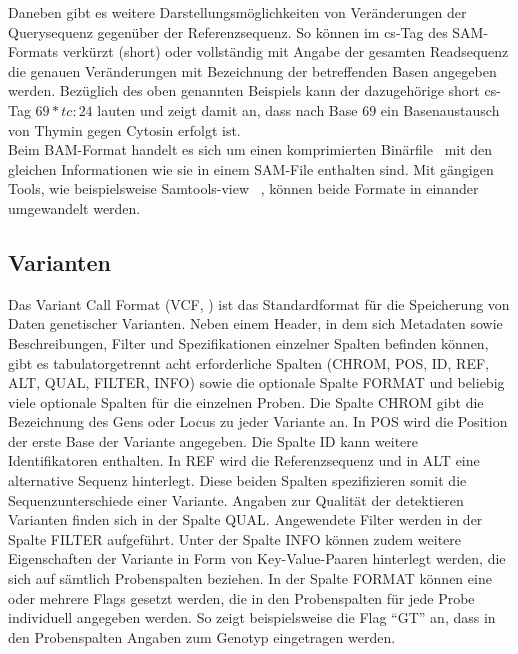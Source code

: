 Daneben gibt es weitere Darstellungsmöglichkeiten von Veränderungen der Querysequenz gegenüber der Referenzsequenz. So können im cs-Tag des SAM-Formats verkürzt (short) oder vollständig mit Angabe der gesamten Readsequenz die genauen Veränderungen mit Bezeichnung der betreffenden Basen angegeben werden. Bezüglich des oben genannten Beispiels kann der dazugehörige short cs-Tag $ 69*tc:24 $ lauten und zeigt damit an, dass nach Base $69$ ein Basenaustausch von Thymin gegen Cytosin erfolgt ist.\\

Beim BAM-Format handelt es sich um einen komprimierten Binärfile~\cite{sam_bam} mit den gleichen Informationen wie sie in einem SAM-File enthalten sind. Mit gängigen Tools, wie beispielsweise Samtools-view ~\cite{li_2009}, können beide Formate in einander umgewandelt werden.

\subsection{Varianten} \label{subsec:vcformat}
Das Variant Call Format (VCF, \cite{danecek_2011}) ist das Standardformat für die Speicherung von Daten genetischer Varianten. Neben einem Header, in dem sich Metadaten sowie Beschreibungen, Filter und Spezifikationen einzelner Spalten befinden können, gibt es tabulatorgetrennt acht erforderliche  Spalten (CHROM, POS, ID, REF, ALT, QUAL, FILTER, INFO) sowie die optionale Spalte FORMAT und beliebig viele optionale Spalten für die einzelnen Proben. Die Spalte CHROM gibt die Bezeichnung des Gens oder Locus zu jeder Variante an. In POS wird die Position der erste Base der Variante angegeben. Die Spalte ID kann weitere Identifikatoren enthalten. In REF wird die Referenzsequenz und in ALT eine alternative Sequenz hinterlegt. Diese beiden Spalten spezifizieren somit die Sequenzunterschiede einer Variante. Angaben zur Qualität der detektieren Varianten finden sich in der Spalte QUAL. Angewendete Filter werden in der Spalte FILTER aufgeführt. Unter der Spalte INFO können zudem weitere Eigenschaften der Variante in Form von Key-Value-Paaren hinterlegt werden, die sich auf sämtlich Probenspalten beziehen. In der Spalte FORMAT können eine oder mehrere Flags gesetzt werden, die in den Probenspalten für jede Probe individuell angegeben werden. So zeigt beispielsweise die Flag ``GT'' an, dass in den Probenspalten Angaben zum Genotyp eingetragen werden.
\let\cleardoublepage\clearpage